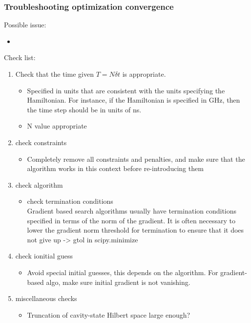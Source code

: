 \documentclass{article}
\begin{document}
\subsubsection{Troubleshooting optimization convergence}
Possible issue: 
\begin{itemize}
    \item 
\end{itemize}

Check list: 
\begin{enumerate}
    \item Check that the time given $T = N \delta t$ is appropriate.
        \begin{itemize}
            \item Specified in units that are consistent with the units specifying the Hamiltonian. For instance, if the Hamiltonian is specified in GHz, then the time step should be in units of ns.
            \item N value appropriate
        \end{itemize}
    \item check constraints
        \begin{itemize}
            \item Completely remove all constraints and penalties, and make sure that the algorithm works in this context before re-introducing them
        \end{itemize}
    \item check algorithm 
        \begin{itemize}
            \item check termination conditions \\
            Gradient based search algorithms usually have termination conditions specified in terms of the norm of the gradient. It is often necessary to lower the gradient norm threshold for termination to ensure that it does not give up -> gtol in scipy.minimize

        \end{itemize}
    \item check ionitial guess
        \begin{itemize}
            \item Avoid special initial guesses, this depends on the algorithm. 
                For gradient-based algo, make sure initial gradient is not vanishing.
        \end{itemize}
    \item miscellaneous checks
        \begin{itemize}
            \item Truncation of cavity-state Hilbert space large enough? 
        \end{itemize}
\end{enumerate}
\end{document}
